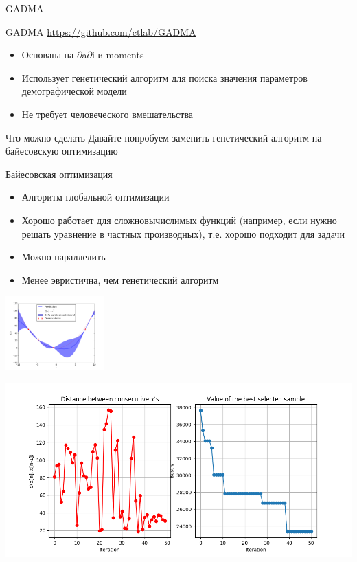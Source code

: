 \documentclass[presentation, smaller]{beamer}
\newcommand{\dadi}{$\partial$a$\partial$i\xspace }
\begin{document}
\begin{frame}[label={sec:org87226f9}]{GADMA}
\begin{block}{GADMA}
\url{https://github.com/ctlab/GADMA}
\begin{itemize}
\item Основана на \dadi и moments
\item Использует генетический алгоритм для поиска значения параметров
демографической модели
\item Не требует человеческого вмешательства
\end{itemize}
\end{block}
\end{frame}

\begin{frame}[label={sec:org3661505}]{Что можно сделать}
Давайте попробуем заменить генетический алгоритм на байесовскую оптимизацию
\begin{block}{Байесовская оптимизация}
\begin{itemize}
\item Алгоритм глобальной оптимизации
\item Хорошо работает для сложновычислимых функций (например, если нужно решать
уравнение в частных производных), т.е. хорошо подходит для задачи
\item Можно параллелить
\item Менее эвристична, чем генетический алгоритм
\end{itemize}
\begin{center}
\includegraphics[width=1.5in]{./pics/bayes.png}
\end{center}
\end{block}
\end{frame}

\begin{frame}[label={sec:org74152c5}]{\xspace}
\begin{center}
\includegraphics[width=.9\linewidth]{./pics/conv.png}
\end{center}
\end{frame}
\end{document}
